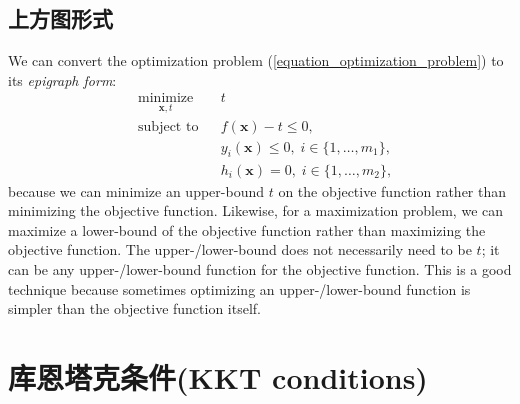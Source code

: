 \documentclass[lang=cn,10pt]{gorgeousnbook}
\numberwithin{equation}{section}%
\numberwithin{figure}{section}%
\begin{document}
\subsection{上方图形式}
We can convert the optimization problem (\ref{equation_optimization_problem}) to its \textit{epigraph form}:
\begin{equation}
\begin{aligned}
& \underset{\boldsymbol{x}, t}{\text{minimize}}
& & t \\
& \text{subject to}
& & f(\boldsymbol{x}) - t \leq 0, \\
& & & y_i(\boldsymbol{x}) \leq 0, \; i \in \{1, \ldots, m_1\}, \\
& & & h_i(\boldsymbol{x}) = 0, \; i \in \{1, \ldots, m_2\},
\end{aligned}
\end{equation}
because we can minimize an upper-bound $t$ on the objective function rather than minimizing the objective function.
Likewise, for a maximization problem, we can maximize a lower-bound of the objective function rather than maximizing the objective function.
The upper-/lower-bound does not necessarily need to be $t$; it can be any upper-/lower-bound function for the objective function.
This is a good technique because sometimes optimizing an upper-/lower-bound function is simpler than the objective function itself.

 
\section{库恩塔克条件(KKT conditions)}
\end{document}
